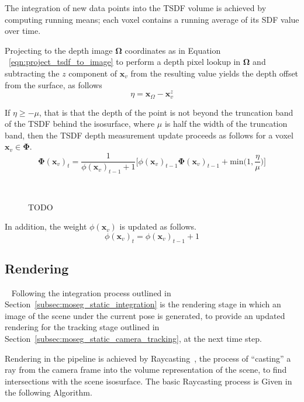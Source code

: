 The integration of new data points into the TSDF volume is achieved by computing 
running means; each voxel contains a running average of its SDF value over time.

Projecting to the depth image \(\bm{\Omega}\) coordinates as in Equation
~\ref{eqn:project_tsdf_to_image} to perform a depth pixel lookup in \(\bm{\Omega}\)
and subtracting the \(z\) component of \(\bm{x}_{v}\) from the resulting value
yields the depth offset from the surface, as follows
\begin{equation}
  \label{eqn:integration_offset}
  \eta = \bm{x}_{\Omega} - \bm{x}_{v}^{z}
\end{equation}

If \( \eta \geq -\mu \), that is that the depth of the point is not beyond the
truncation band of the TSDF behind the isosurface, where \( \mu \) is half the 
width of the truncation band, then the TSDF depth measurement update 
proceeds as follows for a voxel \(\bm{x}_{v} \in \bm{\Phi}\).
\begin{equation}
\label{eqn:sdf_update}
\bm{\Phi}{(\bm{x}_{v})}_{t} = \frac{1}{\phi{(\bm{x}_{v})}_{t-1} + 1}
\bigg[\phi{(\bm{x}_{v})}_{t-1}\bm{\bm{\Phi}}{(\bm{x}_{v})}_{t-1} +
\text{min} \bigg( 1, \frac{\eta}{\mu} \bigg)
\bigg]
\end{equation}

\begin{figure}[!htbp]
  \caption{TODO}
~\label{figure:truncation_band}
\end{figure}

In addition, the weight \(\phi(\bm{x}_{v})\) is updated as follows.
\begin{equation}
  \label{eqn:sdf_weight_update}
  \phi{(\bm{x}_{v})}_{t} = \phi{(\bm{x}_{v})}_{t-1} + 1
\end{equation}

\subsection{Rendering}
~\label{subsec:moseg_static_rendering}
Following the integration process outlined in Section~\ref{subsec:moseg_static_integration} 
is the rendering stage in which an image of the scene under the current pose is generated, to 
provide an updated rendering for the tracking stage outlined in Section~\ref{subsec:moseg_static_camera_tracking}, 
at the next time step.

Rendering in the pipeline is achieved by Raycasting~\cite{Roth1982}, the process of 
``casting'' a ray from the camera frame into the volume representation of the scene, to find intersections with 
the scene isosurface. The basic Raycasting process is Given in the following Algorithm.

